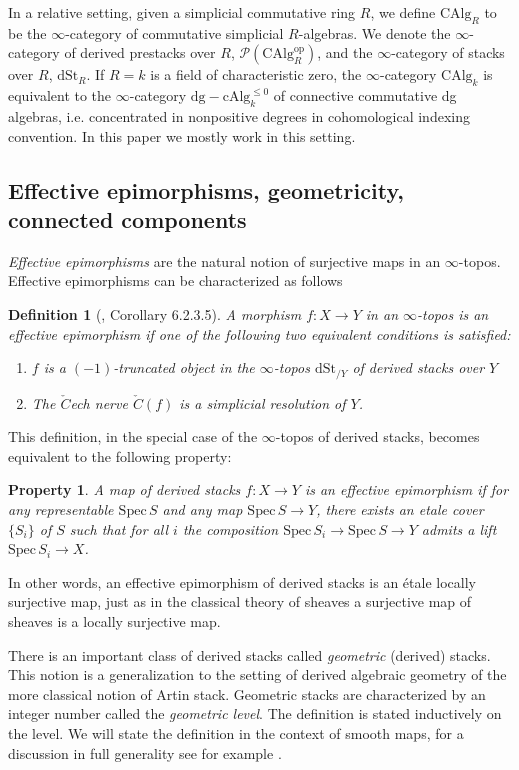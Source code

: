 \documentclass[11pt,letterpaper]{amsart}
\newtheorem{definition}[dummy]{Definition}
\newtheorem{property}{Property}
\newcommand{\cP}{\mathcal{P}}
\newcommand{\op}{\mathrm{op}}
\newcommand{\dSt}{\mathrm{dSt}}
\newcommand{\Spec}{\mathrm{S}\mathrm{pec}\,}
\newcommand{\CAlg}{\mathrm{CAlg}}
\begin{document}
In a relative setting, given a simplicial commutative ring $R$, we define $\CAlg_R$ to be the $\infty$-category of commutative simplicial $R$-algebras.  We denote the $\infty$-category of derived prestacks over $R$, $\cP(\CAlg_R^\op)$, and the $\infty$-category of stacks over $R$, $\dSt_R$. If $R=k$ is a field of characteristic zero, the $\infty$-category $\CAlg_k$ is equivalent to the $\infty$-category $\mathrm{dg-cAlg}_{k}^{\le 0}$ of connective commutative dg algebras, i.e. concentrated in nonpositive degrees in cohomological indexing convention. In this paper we mostly work in this setting.

\subsection{Effective epimorphisms, geometricity, connected components}
\emph{Effective epimorphisms} are the natural notion of surjective maps in an  $\infty$-topos. Effective epimorphisms can be characterized as follows

\begin{definition}[\cite{HTT}, Corollary 6.2.3.5]
A morphism $f:X\rightarrow Y$ in an $\infty$-topos is an \emph{effective epimorphism} if one of the following two equivalent conditions is satisfied:
	\begin{enumerate}
		\item $f$ is a $(-1)$-truncated object in the $\infty$-topos $\dSt_{/Y}$ of derived stacks over $Y$ 
		\item The $\check{C}$ech nerve $\check{C}(f)$ is a simplicial resolution of $Y$.
	\end{enumerate}
\end{definition}
This definition, in the special case of the $\infty$-topos of derived stacks, becomes equivalent to the following property:
\begin{property}
A map of derived stacks $f:X\rightarrow Y$ is an effective epimorphism if for any representable $\Spec S$ and any map $\Spec S\rightarrow Y$, there exists an etale cover $\{S_i\}$ of $S$ such that for all $i$ the composition $\Spec S_i\rightarrow\Spec S\rightarrow Y$ admits a lift $\Spec S_i\rightarrow X$.
\end{property}
In other words, an effective epimorphism of derived stacks is an étale locally surjective map, just as in the classical theory of sheaves a surjective map of sheaves is a locally surjective map.

There is an important class of derived stacks called \emph{geometric} (derived) stacks. This notion is   a generalization to the setting of derived algebraic geometry of the more classical notion of Artin stack. Geometric stacks are characterized by an integer number called the \emph{geometric level}. The definition is stated inductively on the level. We will state the definition in the context of smooth maps, for a discussion in full generality see for example \cite{PORTA2016351}.
\end{document}
